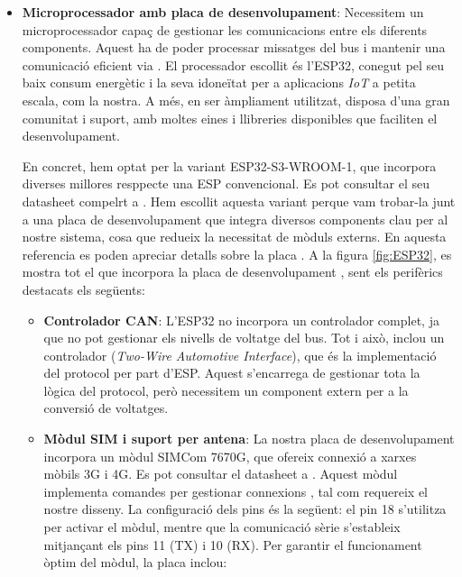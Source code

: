 \documentclass{tfgitic}[2024/07/01]
\begin{document}
\begin{itemize}
  \item \textbf{Microprocessador amb placa de desenvolupament}: Necessitem un microprocessador capaç de gestionar les comunicacions entre els diferents components. Aquest ha de poder processar 
  missatges del bus  i mantenir una comunicació eficient via . El processador escollit és l'ESP32, conegut pel seu baix consum energètic i la seva idoneïtat per a aplicacions \textit{IoT} a 
  petita escala, com la nostra. A més, en ser àmpliament utilitzat, disposa d'una gran comunitat i suport, amb moltes eines i llibreries disponibles que faciliten el desenvolupament.

  En concret, hem optat per la variant ESP32-S3-WROOM-1, que incorpora diverses millores resppecte una ESP convencional. Es pot consultar el seu datasheet compelrt a \cite{espressif_esp32s3}.
  Hem escollit aquesta variant perque vam trobar-la junt a una placa de desenvolupament que integra diversos components clau per al nostre sistema, cosa que redueix la necessitat de mòduls externs.
  En aquesta referencia es poden apreciar detalls sobre la placa \cite{lilygo_sim7670g}. A la figura \ref{fig:ESP32}, es mostra tot el que incorpora la placa de desenvolupament , sent els perifèrics destacats els següents:

  \begin{itemize}
    \item \textbf{Controlador CAN}: L'ESP32 no incorpora un controlador  complet, ja que no pot gestionar els nivells de voltatge del bus. Tot i això, inclou un controlador  
    (\textit{Two-Wire Automotive Interface}), que és la implementació del protocol  per part d'ESP. Aquest s'encarrega de gestionar tota la lògica del protocol, però necessitem un component 
    extern per a la conversió de voltatges.
  
    \item \textbf{Mòdul SIM i suport per antena}: La nostra placa de desenvolupament incorpora un mòdul SIMCom 7670G, que ofereix connexió a xarxes mòbils 3G i 4G. Es pot consultar el datasheet a \cite{simcom_a7670}.
    Aquest mòdul implementa comandes  per gestionar connexions , tal com requereix el nostre disseny. La configuració dels pins és la següent: el pin  18 s'utilitza per activar el mòdul, mentre que la comunicació sèrie 
    s'estableix mitjançant els pins  11 (TX) i  10 (RX). Per garantir el funcionament òptim del mòdul, la placa inclou:


\end{itemize}
\end{itemize}
\end{document}
